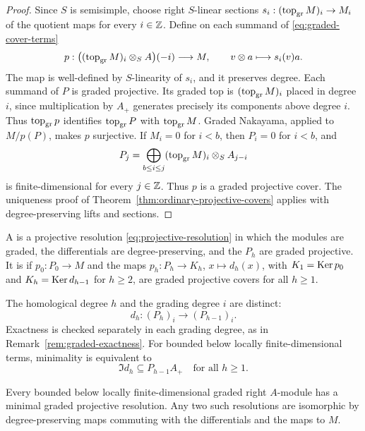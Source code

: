 \begin{proof}
Since $S$ is semisimple, choose right $S$-linear sections $s_i:(\operatorname{top}\nolimits_{\mathrm{gr}} M)_i\to M_i$ of the quotient maps for every $i\in\mathbb{Z}$.
Define on each summand of \eqref{eq:graded-cover-terms}
\[
p:\bigl((\operatorname{top}\nolimits_{\mathrm{gr}} M)_i\otimes_S A\bigr)(-i)\longrightarrow M,
\qquad v\otimes a\longmapsto s_i(v)a.
\]
The map is well-defined by $S$-linearity of $s_i$, and it preserves degree.
Each summand of $P$ is graded projective.
Its graded top is $(\operatorname{top}\nolimits_{\mathrm{gr}} M)_i$ placed in degree $i$, since multiplication by $A_+$ generates precisely its components above degree $i$.
Thus $\operatorname{top}\nolimits_{\mathrm{gr}} p$ identifies $\operatorname{top}\nolimits_{\mathrm{gr}} P$ with $\operatorname{top}\nolimits_{\mathrm{gr}} M$.
Graded Nakayama, applied to $M/p(P)$, makes $p$ surjective.
If $M_i=0$ for $i<b$, then $P_i=0$ for $i<b$, and
\[
P_j=\bigoplus_{b\leq i\leq j}(\operatorname{top}\nolimits_{\mathrm{gr}} M)_i\otimes_S A_{j-i}
\]
is finite-dimensional for every $j\in\mathbb{Z}$.
Thus $p$ is a graded projective cover.
The uniqueness proof of Theorem~\ref{thm:ordinary-projective-covers} applies with degree-preserving lifts and sections.
\end{proof}

\begin{definition}\label{def:minimal-resolution}
A  is a projective resolution \eqref{eq:projective-resolution} in which the modules are graded, the differentials are degree-preserving, and the $P_h$ are graded projective.
It is  if $p_0:P_0\to M$ and the maps $p_h:P_h\to K_h$, $x\mapsto d_h(x)$, with $K_1=\operatorname{Ker}\nolimits p_0$ and $K_h=\operatorname{Ker}\nolimits d_{h-1}$ for $h\geq2$, are graded projective covers for all $h\geq1$.
\end{definition}

The homological degree $h$ and the grading degree $i$ are distinct:
\[
d_h:(P_h)_i\longrightarrow(P_{h-1})_i.
\]
Exactness is checked separately in each grading degree, as in Remark~\ref{rem:graded-exactness}.
For bounded below locally finite-dimensional terms, minimality is equivalent to
\begin{equation}\label{eq:graded-minimal-criterion}
\Im d_h\subseteq P_{h-1}A_+\quad\text{for all }h\geq1.
\end{equation}

\begin{theorem}\label{thm:minimal-resolution}
Every bounded below locally finite-dimensional graded right $A$-module has a minimal graded projective resolution.
Any two such resolutions are isomorphic by degree-preserving maps commuting with the differentials and the maps to $M$.
\end{theorem}

